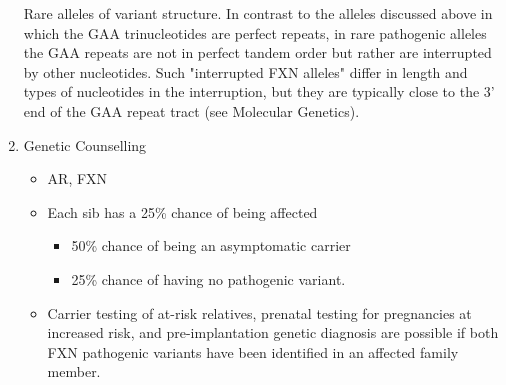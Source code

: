 \documentclass[12pt]{scrartcl}
\begin{document}
\begin{enumerate}
Rare alleles of variant structure. In contrast to the alleles discussed above in which the GAA trinucleotides are perfect repeats, in rare pathogenic alleles the GAA repeats are not in perfect tandem order but rather are interrupted by other nucleotides. Such "interrupted FXN alleles" differ in length and types of nucleotides in the interruption, but they are typically close to the 3' end of the GAA repeat tract (see Molecular Genetics).
\item Genetic Counselling
\label{sec:orge6d21a8}
\begin{itemize}
\item AR, FXN
\item Each sib has a 25\% chance of being affected
\begin{itemize}
\item 50\% chance of being an asymptomatic carrier
\item 25\% chance of having no pathogenic variant.
\end{itemize}
\item Carrier testing of at-risk relatives, prenatal testing for
pregnancies at increased risk, and pre-implantation genetic diagnosis
are possible if both FXN pathogenic variants have been identified in
an affected family member.
\end{itemize}
\end{enumerate}
\end{document}
